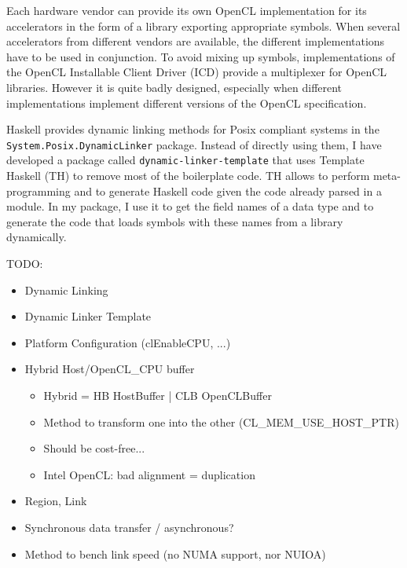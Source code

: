Each hardware vendor can provide its own OpenCL implementation for its
accelerators in the form of a library exporting appropriate symbols. When
several accelerators from different vendors are available, the different
implementations have to be used in conjunction. To avoid mixing up symbols,
implementations of the OpenCL Installable Client Driver (ICD) provide a
multiplexer for OpenCL libraries. However it is quite badly designed, especially
when different implementations implement different versions of the OpenCL
specification.

Haskell provides dynamic linking methods for Posix compliant systems in the
\texttt{System.Posix.DynamicLinker} package. Instead of directly using them, I
have developed a package called \texttt{dynamic-linker-template} that uses
Template Haskell (TH) to remove most of the boilerplate code. TH allows to
perform meta-programming and to generate Haskell code given the code already
parsed in a module. In my package, I use it to get the field names of a data
type and to generate the code that loads symbols with these names from a
library dynamically.

TODO: 
\begin{itemize}
   \item Dynamic Linking
   \item Dynamic Linker Template
   \item Platform Configuration (clEnableCPU, ...)
   \item Hybrid Host/OpenCL\_CPU buffer
   \begin{itemize}
      \item Hybrid = HB HostBuffer | CLB OpenCLBuffer
      \item Method to transform one into the other (CL\_MEM\_USE\_HOST\_PTR)
      \item Should be cost-free...
      \item Intel OpenCL: bad alignment = duplication
   \end{itemize}
   \item Region, Link
   \item Synchronous data transfer / asynchronous?
   \item Method to bench link speed (no NUMA support, nor NUIOA)
\end{itemize}

